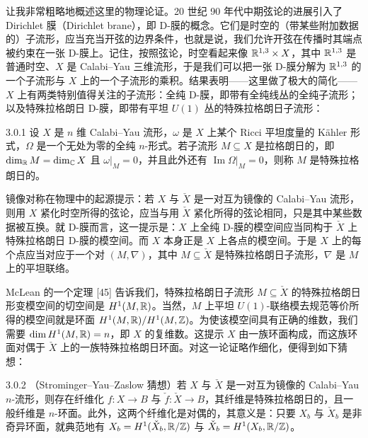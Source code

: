 让我非常粗略地概述这里的物理论证。20 世纪 90 年代中期弦论的进展引入了 Dirichlet 膜（Dirichlet brane），即 D-膜的概念。它们是时空的（带某些附加数据的）子流形，应当充当开弦的边界条件，也就是说，我们允许开弦在传播时其端点被约束在一张 D-膜上。记住，按照弦论，时空看起来像 $\mathbb{R}^{1,3}\times X$，其中 $\mathbb{R}^{1,3}$ 是普通时空、$X$ 是 Calabi--Yau 三维流形，于是我们可以把一张 D-膜分解为 $\mathbb{R}^{1,3}$ 的一个子流形与 $X$ 上的一个子流形的乘积。结果表明------这里做了极大的简化------$X$ 上有两类特别值得关注的子流形：全纯 D-膜，即带有全纯线丛的全纯子流形；以及特殊拉格朗日 D-膜，即带有平坦 $U(1)$ 丛的特殊拉格朗日子流形：

\begin{definition}{3.0.1}
设 $X$ 是 $n$ 维 Calabi--Yau 流形，$\omega$ 是 $X$ 上某个 Ricci 平坦度量的 Kähler 形式，$\Omega$ 是一个无处为零的全纯 $n$-形式。若子流形 $M\subseteq X$ 是拉格朗日的，即 $\dim_{\mathbb{R}} M=\dim_{\mathbb{C}} X$ 且 $\omega|_M=0$，并且此外还有 $\operatorname{Im}\Omega|_M=0$，则称 $M$ 是特殊拉格朗日的。
\end{definition}


镜像对称在物理中的起源提示：若 $X$ 与 $\check X$ 是一对互为镜像的 Calabi--Yau 流形，则用 $X$ 紧化时空所得的弦论，应当与用 $\check X$ 紧化所得的弦论相同，只是其中某些数据被互换。就 D-膜而言，这一提示是：$X$ 上全纯 D-膜的模空间应当同构于 $\check X$ 上特殊拉格朗日 D-膜的模空间。而 $X$ 本身正是 $X$ 上各点的模空间。于是 $X$ 上的每个点应当对应于一个对 $(M,\nabla)$，其中 $M\subseteq\check X$ 是特殊拉格朗日子流形，$\nabla$ 是 $M$ 上的平坦联络。

McLean 的一个定理 [45] 告诉我们，特殊拉格朗日子流形 $M\subseteq\check X$ 的特殊拉格朗日形变模空间的切空间是 $H^1(M,\mathbb{R})$。当然，$M$ 上平坦 $U(1)$-联络模去规范等价所得的模空间就是环面 $H^1(M,\mathbb{R})/H^1(M,\mathbb{Z})$。为使该模空间具有正确的维数，我们需要 $\dim H^1(M,\mathbb{R})=n$，即 $X$ 的复维数。这提示 $X$ 由一族环面构成，而这族环面对偶于 $\check X$ 上的一族特殊拉格朗日环面。对这一论证略作细化，便得到如下猜想：

\begin{conjecture}{3.0.2}
（Strominger--Yau--Zaslow 猜想）若 $X$ 与 $\check X$ 是一对互为镜像的 Calabi--Yau $n$-流形，则存在纤维化 $f:X\to B$ 与 $\check f:\check X\to B$，其纤维是特殊拉格朗日的，且一般纤维是 $n$-环面。此外，这两个纤维化是对偶的，其意义是：只要 $X_b$ 与 $\check X_b$ 是非奇异环面，就典范地有 $X_b=H^1(\check X_b,\mathbb{R}/\mathbb{Z})$ 与 $\check X_b=H^1(X_b,\mathbb{R}/\mathbb{Z})$。
\end{conjecture}

